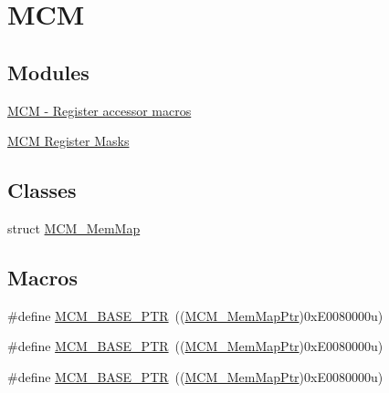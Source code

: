 \hypertarget{group___m_c_m___peripheral}{}\section{M\+CM}
\label{group___m_c_m___peripheral}
\subsection*{Modules}
\begin{DoxyCompactItemize}
\item 
\hyperlink{group___m_c_m___register___accessor___macros}{M\+C\+M -\/ Register accessor macros}
\item 
\hyperlink{group___m_c_m___register___masks}{M\+C\+M Register Masks}
\end{DoxyCompactItemize}
\subsection*{Classes}
\begin{DoxyCompactItemize}
\item 
struct \hyperlink{struct_m_c_m___mem_map}{M\+C\+M\+\_\+\+Mem\+Map}
\end{DoxyCompactItemize}
\subsection*{Macros}
\begin{DoxyCompactItemize}
\item 
\#define \hyperlink{group___m_c_m___peripheral_gad41e931f176c230831e3dbad45117841}{M\+C\+M\+\_\+\+B\+A\+S\+E\+\_\+\+P\+TR}~((\hyperlink{group___m_c_m___peripheral_ga72e8bbe428d9410917903164d3a5f675}{M\+C\+M\+\_\+\+Mem\+Map\+Ptr})0x\+E0080000u)
\item 
\#define \hyperlink{group___m_c_m___peripheral_gad41e931f176c230831e3dbad45117841}{M\+C\+M\+\_\+\+B\+A\+S\+E\+\_\+\+P\+TR}~((\hyperlink{group___m_c_m___peripheral_ga72e8bbe428d9410917903164d3a5f675}{M\+C\+M\+\_\+\+Mem\+Map\+Ptr})0x\+E0080000u)
\item 
\#define \hyperlink{group___m_c_m___peripheral_gad41e931f176c230831e3dbad45117841}{M\+C\+M\+\_\+\+B\+A\+S\+E\+\_\+\+P\+TR}~((\hyperlink{group___m_c_m___peripheral_ga72e8bbe428d9410917903164d3a5f675}{M\+C\+M\+\_\+\+Mem\+Map\+Ptr})0x\+E0080000u)
\end{DoxyCompactItemize}
